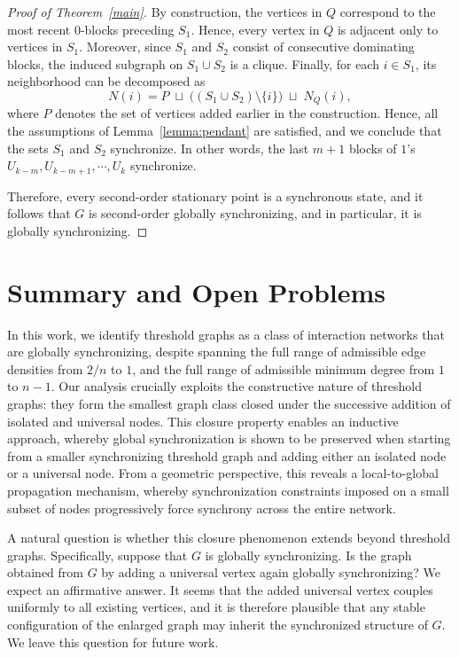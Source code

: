 \documentclass[11pt,reqno]{amsart}
\theoremstyle{definition}
\begin{document}
\begin{proof}[Proof of Theorem~\ref{main}]
By construction, the vertices in $Q$ correspond to the most recent $0$-blocks
preceding $S_1$. Hence, every vertex in $Q$ is adjacent only to vertices in $S_1$.
Moreover, since $S_1$ and $S_2$ consist of consecutive dominating blocks,
the induced subgraph on $S_1 \cup S_2$ is a clique.
Finally, for each $i\in S_1$, its neighborhood can be decomposed as
\[
N(i) = P \;\sqcup\; \bigl((S_1\cup S_2)\setminus\{i\}\bigr) \;\sqcup\; N_Q(i),
\]
where $P$ denotes the set of vertices added earlier in the construction.
Hence, all the assumptions of Lemma~\ref{lemma:pendant} are satisfied,
and we conclude that the sets $S_1$ and $S_2$ synchronize.
In other words, the last $m+1$ blocks of $1$'s $U_{k-m}, U_{k-m+1}, \cdots, U_k$ synchronize.

Therefore, every second-order stationary point is a synchronous state, and it follows that $G$ is second-order globally synchronizing, and in particular, it is globally synchronizing.
\end{proof}


\section{Summary and Open Problems}\label{summary} In this work, we identify threshold graphs as a class of interaction networks that are globally synchronizing, despite spanning the full range of admissible edge densities from $2/n$ to $1$, and the full range of admissible minimum degree from $1$ to $n-1$.
Our analysis crucially exploits the constructive nature of threshold graphs: they form the smallest graph class closed under the successive addition of isolated and universal nodes. This closure property enables an inductive approach, whereby global synchronization is shown to be preserved when starting from a smaller synchronizing threshold graph and adding either an isolated node or a universal node. From a geometric perspective, this reveals a local-to-global propagation mechanism, whereby synchronization constraints imposed on a small subset of nodes progressively force synchrony across the entire network.

A natural question is whether this closure phenomenon extends beyond
threshold graphs. Specifically, suppose that $G$ is globally synchronizing.
Is the graph obtained from $G$ by adding a universal vertex again globally
synchronizing? We expect an affirmative answer. It seems that the added universal vertex
couples uniformly to all existing vertices, and it is therefore plausible that
any stable configuration of the enlarged graph may inherit the synchronized
structure of $G$. We leave this question for future work.
\end{document}
